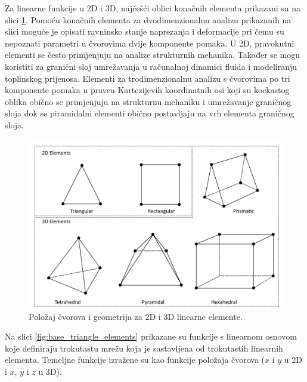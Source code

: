 \documentclass[a4paper,twoside,12pt]{memoir} %
\begin{document}
Za linearne funkcije u 2D i 3D, najčešći oblici konačnih elementa prikazani su na slici \ref{fig:2d_i_3d_elementi}. Pomoću konačnih elementa za dvodimenzionalnu analizu prikazanih na slici moguće je opisati ravninsko stanje naprezanja i deformacije pri čemu su nepoznati parametri u čvorovima dvije komponente pomaka. U 2D, pravokutni elementi se često primjenjuju na analize strukturnih mehanika. Također se mogu koristiti za granični sloj umrežavanja u računalnoj dinamici fluida i modeliranju toplinskog prijenosa. Elementi za trodimenzionalnu analizu s čvorovima po tri komponente pomaka u pravcu Kartezijevih koordinatnih osi koji su kockastog oblika obično se primjenjuju na strukturnu mehaniku i umrežavanje graničnog sloja dok se piramidalni elementi obično postavljaju na vrh elementa graničnog sloja.

\begin{figure}[h!t]
\begin{center}
\includegraphics[scale=0.47]{pictures/chapter_fem/geometry-and-nodes-linear-elements.png}
\caption{Položaj čvorova i geometrija za 2D i 3D linearne elemente. \cite{comsol_fem_general}}
\label{fig:2d_i_3d_elementi}
\end{center}
\end{figure}

Na slici \ref{fig:base_triangle_elements} prikazane su funkcije s linearnom osnovom koje definiraju trokutastu mrežu koja je sastavljena od trokutastih linearnih elementa. Temeljne funkcije izražene su kao funkcije položaja čvorova ($x$ i $y$ u 2D i $x$, $y$ i $z$ u 3D).
\end{document}
